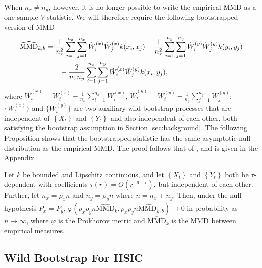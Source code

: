 When $n_x\neq n_y$, however, it is no longer possible to write the empirical MMD
as a one-sample $V$-statistic. We will therefore require the following bootstrapped version of MMD
\begin{align}
\widehat{\text{MMD}}_{k,b}&=\frac{1}{n_x^2}\sum_{i=1}^{n_x}\sum_{j=1}^{n_x}\tilde W_i^{(x)}\tilde W_j^{(x)}k(x_i,x_j)-\frac{1}{n_x^2}\sum_{i=1}^{n_y}\sum_{j=1}^{n_y}\tilde W_i^{(y)}\tilde W_j^{(y)}k(y_i,y_j)\notag\\
{}&\qquad-\frac{2}{n_x n_y}\sum_{i=1}^{n_x}\sum_{j=1}^{n_y}\tilde W_i^{(x)}\tilde W_j^{(y)}k(x_i,y_j),\label{eq:mmdkb}
\end{align}
where $\tilde W_t^{(x)}=W_t^{(x)}-\frac{1}{n_x}\sum_{i=1}^{n_x}W_i^{(x)}$, $\tilde W_t^{(y)}=W_t^{(y)}-\frac{1}{n_y}\sum_{j=1}^{n_y}W_j^{(y)}$;  $\{W_t^{(x)}\}$ and $\{W_t^{(y)}\}$ are two auxiliary wild bootstrap processes that are independent of $\left\{ X_t \right\}$ and $\left\{ Y_t \right\}$ and also independent of each other, both satisfying the bootstrap assumption in Section \ref{sec:background}.  
The following Proposition shows that the bootstrapped statistic has the same asymptotic null distribution as the empirical MMD. The proof follows that of \cite[Theorem 3.1]{leucht_dependent_2013}, and is given in the Appendix.

\begin{proposition}\label{prop:mmd}
 Let $k$ be bounded and Lipschitz continuous, and let $\left\{ X_t \right\}$ and $\left\{ Y_t \right\}$ 
 both be $\tau$-dependent with coefficients $\tau(r) =  O(r^{-6-\epsilon})$, but independent of each other. Further, let $n_x=\rho_x n$ and $n_y=\rho_y n$ where $n=n_x+n_y$. Then, under the null hypothesis $P_x=P_y$, $\varphi\left(\rho_x \rho_y n\widehat{\text{MMD}}_k, \rho_x \rho_y n\widehat{\text{MMD}}_{k,b}\right)\to 0$ in probability as $n\to\infty$, where $\varphi$ is the Prokhorov metric and $\widehat{\text{MMD}}_k$ is the MMD between empirical measures.
\end{proposition}

\subsection{Wild Bootstrap For HSIC}\label{sec:hsic}

